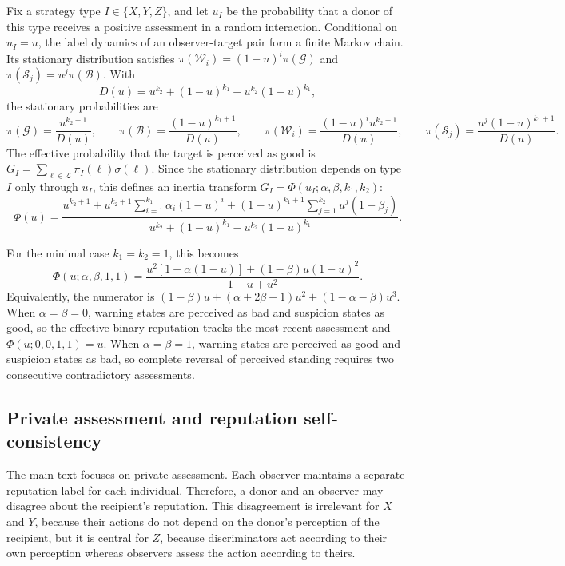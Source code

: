 \documentclass[fleqn,10pt]{wlscirep}
\begin{document}
Fix a strategy type $I\in\{X,Y,Z\}$, and let $u_I$ be the probability that a donor of this type receives a positive assessment in a random interaction. Conditional on $u_I=u$, the label dynamics of an observer-target pair form a finite Markov chain. Its stationary distribution satisfies $\pi(\mathcal{W}_i)=(1-u)^i\pi(\mathcal{G})$ and $\pi(\mathcal{S}_j)=u^j\pi(\mathcal{B})$. With
\[
D(u)=u^{k_2}+(1-u)^{k_1}-u^{k_2}(1-u)^{k_1},
\]
the stationary probabilities are
\begin{equation}
\label{eq:stationary-label-distribution}
\pi(\mathcal{G})=\frac{u^{k_2+1}}{D(u)},\qquad
\pi(\mathcal{B})=\frac{(1-u)^{k_1+1}}{D(u)},\qquad
\pi(\mathcal{W}_i)=\frac{(1-u)^iu^{k_2+1}}{D(u)},\qquad
\pi(\mathcal{S}_j)=\frac{u^j(1-u)^{k_1+1}}{D(u)} .
\end{equation}
The effective probability that the target is perceived as good is $G_I=\sum_{\ell\in\mathcal{L}}\pi_I(\ell)\sigma(\ell)$. Since the stationary distribution depends on type $I$ only through $u_I$, this defines an inertia transform $G_I=\Phi(u_I;\alpha,\beta,k_1,k_2)$:
\begin{equation}
\label{eq:inertia-transform}
\Phi(u)=
\frac{
u^{k_2+1}
+u^{k_2+1}\sum_{i=1}^{k_1}\alpha_i(1-u)^i
+(1-u)^{k_1+1}\sum_{j=1}^{k_2}u^j(1-\beta_j)
}{
u^{k_2}+(1-u)^{k_1}-u^{k_2}(1-u)^{k_1}
}.
\end{equation}

For the minimal case $k_1=k_2=1$, this becomes
\begin{equation}
\label{eq:minimal-inertia-transform}
\Phi(u;\alpha,\beta,1,1)=
\frac{u^2[1+\alpha(1-u)]+(1-\beta)u(1-u)^2}{1-u+u^2}.
\end{equation}
Equivalently, the numerator is $(1-\beta)u+(\alpha+2\beta-1)u^2+(1-\alpha-\beta)u^3$. When $\alpha=\beta=0$, warning states are perceived as bad and suspicion states as good, so the effective binary reputation tracks the most recent assessment and $\Phi(u;0,0,1,1)=u$. When $\alpha=\beta=1$, warning states are perceived as good and suspicion states as bad, so complete reversal of perceived standing requires two consecutive contradictory assessments.

\subsection*{Private assessment and reputation self-consistency}

The main text focuses on private assessment. Each observer maintains a separate reputation label for each individual. Therefore, a donor and an observer may disagree about the recipient's reputation. This disagreement is irrelevant for $X$ and $Y$, because their actions do not depend on the donor's perception of the recipient, but it is central for $Z$, because discriminators act according to their own perception whereas observers assess the action according to theirs.
\end{document}
